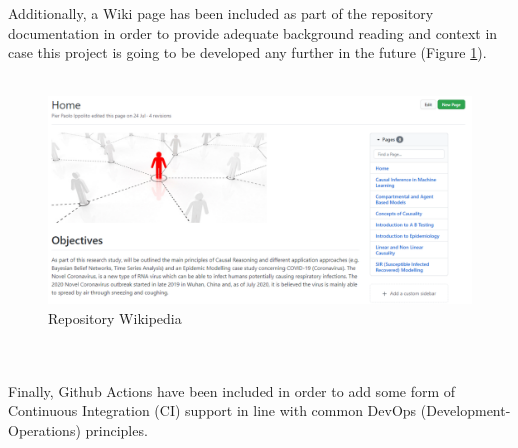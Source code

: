 \begin{appendices}
Additionally, a Wiki page has been included as part of the repository documentation in order to provide adequate background reading and context in case this project is going to be developed any further in the future (Figure \ref{wiki_ref}).
\\
\\
\begin{figure}[ht!]%
    \centering
    \includegraphics[page=1,scale=0.56]{latex/images/wiki_page.pdf}
    \caption{Repository Wikipedia}%
    \label{wiki_ref}
\end{figure}
\\
\\
Finally, Github Actions have been included in order to add some form of Continuous Integration (CI) support in line with common DevOps (Development-Operations) principles.

\clearpage


\clearpage

\end{appendices}
